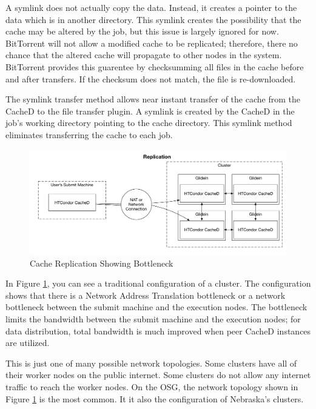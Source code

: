 A symlink does not actually copy the data.  Instead, it creates a pointer to the data which is in another directory.  This symlink creates the possibility that the cache may be altered by the job, but this issue is largely ignored for now.  BitTorrent will not allow a modified cache to be replicated; therefore, there no chance that the altered cache will propagate to other nodes in the system.  BitTorrent provides this guarentee by checksumming all files in the cache before and after transfers.  If the checksum does not match, the file is re-downloaded.

The symlink transfer method allows near instant transfer of the cache from the CacheD to the file transfer plugin.  A symlink is created by the CacheD in the job's working directory pointing to the cache directory.  This symlink method eliminates transferring the cache to each job.

\begin{figure}[ht]
\centering
\includegraphics[width=\textwidth]{images/ReplicationBottleneck.pdf}
\caption{Cache Replication Showing Bottleneck}
\label{fig:cachebottleneck}
\end{figure}

In Figure \ref{fig:cachebottleneck}, you can see a traditional configuration of a cluster.  The configuration shows that there is a Network Address Translation bottleneck or a network bottleneck between the submit machine and the execution nodes.  The bottleneck limits the bandwidth between the submit machine and the execution nodes; for data distribution, total bandwidth is much improved when peer CacheD instances are utilized.

This is just one of many possible network topologies.  Some clusters have all of their worker nodes on the public internet.  Some clusters do not allow any internet traffic to reach the worker nodes.  On the OSG, the network topology shown in Figure \ref{fig:cachebottleneck} is the most common.  It it also the configuration of Nebraska's clusters.


